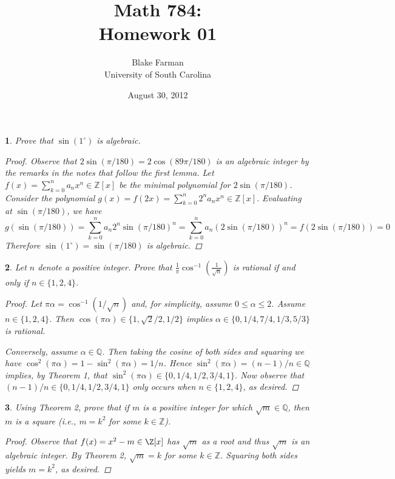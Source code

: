 \documentclass[10pt]{amsart}
\author{Blake Farman\\University of South Carolina}
\title{Math 784:\\Homework 01}
\date{August 30, 2012}
\begin{document}
\maketitle

\newtheorem{thm}{}

\begin{thm}
	Prove that $\sin(1^\circ)$ is algebraic.
	\begin{proof}
	Observe that $2\sin(\pi/180) = 2\cos(89\pi/180)$ is an algebraic integer by the remarks in the notes that follow the first lemma.
	Let $f(x) = \sum_{k=0}^n a_nx^n \in \mathbb{Z}[x]$ be the minimal polynomial for $2\sin(\pi/180)$.
	Consider the polynomial $g(x) = f(2x) = \sum_{k=0}^n 2^na_nx^n \in \mathbb{Z}[x].$  
        Evaluating at $\sin(\pi/180)$, we have 
        $$g(\sin(\pi/180)) = \sum_{k=0}^n a_n2^n\sin(\pi/180)^n = \sum_{k=0}^n a_n(2\sin(\pi/180))^n = f(2\sin(\pi/180)) = 0$$
	Therefore $\sin(1^\circ) = \sin(\pi/180)$ is algebraic.
	\end{proof}
\end{thm}

\begin{thm}
	Let $n$ denote a positive integer.  
	Prove that $\displaystyle{\frac{1}{\pi}\cos^{-1}\left(\frac{1}{\sqrt{n}}\right)}$ is rational if and only if $n \in \{1,2,4\}$.
	\begin{proof}
          Let $\pi\alpha = \cos^{-1}(1/\sqrt{n})$ and, for simplicity, assume $0 \leq \alpha \leq 2$.
          Assume $n \in \{1,2,4\}$.  
          Then $\cos(\pi\alpha) \in \{1, \sqrt{2}/2, 1/2\}$ implies $\alpha \in \{0, 1/4, 7/4, 1/3, 5/3\}$ is rational.
          
          Conversely, assume $\alpha \in \mathbb{Q}$.
          Then taking the cosine of both sides and squaring we have $\cos^2(\pi\alpha) = 1-\sin^2(\pi\alpha) = 1/n$.
          Hence $\sin^2(\pi\alpha) = (n-1)/n \in \mathbb{Q}$ implies, by Theorem 1, that $\sin^2(\pi\alpha) \in \{0,1/4,1/2,3/4,1\}$.
          Now observe that  $(n-1)/n \in \{0,1/4,1/2,3/4,1\}$ only occurs when $n \in \{1,2,4\}$, as desired.
	\end{proof}
\end{thm}

\begin{thm}
	Using Theorem 2, prove that if $m$ is a positive integer for which $\sqrt{m} \in \mathbb{Q}$, then $m$ is a square (i.e., $m = k^2$ for some $k \in \mathbb{Z}$).
	\begin{proof}
          Observe that $f(x) = x^2 - m \in \Z[x]$ has $\sqrt{m}$ as a root and thus $\sqrt{m}$ is an algebraic integer.  
          By Theorem 2, $\sqrt{m} = k$ for some $k \in \mathbb{Z}$.
          Squaring both sides yields $m = k^2$, as desired.
	\end{proof}
\end{thm}
\end{document}
